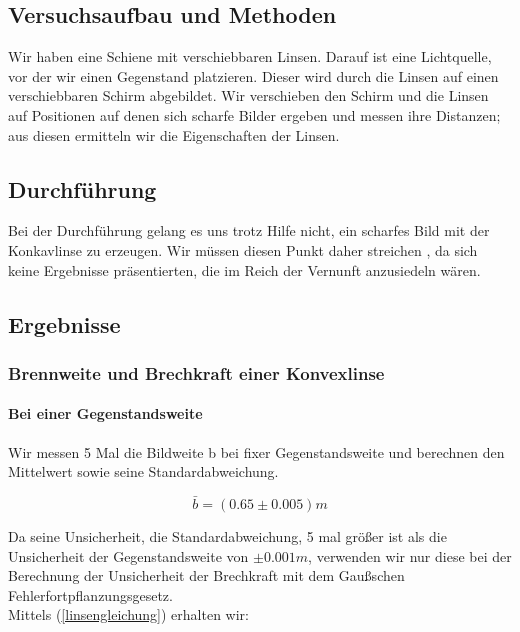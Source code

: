 \documentclass{article}
\begin{document}
\subsection{Versuchsaufbau und Methoden}
Wir haben eine Schiene mit verschiebbaren Linsen. Darauf ist eine Lichtquelle, vor der wir einen Gegenstand platzieren. Dieser wird durch die Linsen auf einen verschiebbaren Schirm abgebildet. Wir verschieben den Schirm und die Linsen auf Positionen auf denen sich scharfe Bilder ergeben und messen ihre Distanzen; aus diesen ermitteln wir die Eigenschaften der Linsen.
\subsection{Durchführung}
Bei der Durchführung gelang es uns trotz Hilfe nicht, ein scharfes Bild mit der Konkavlinse zu erzeugen. Wir müssen diesen Punkt daher streichen	, da sich keine Ergebnisse präsentierten, die im Reich der Vernunft anzusiedeln wären.
\subsection{Ergebnisse}
\subsubsection*{Brennweite und Brechkraft einer Konvexlinse}
\paragraph{Bei einer Gegenstandsweite}

Wir messen 5 Mal die Bildweite b bei fixer Gegenstandsweite und berechnen den Mittelwert sowie seine Standardabweichung.

$$\bar{b}=(0.65 \pm 0.005)m$$

Da seine Unsicherheit, die Standardabweichung, 5 mal größer ist als die Unsicherheit der Gegenstandsweite von $\pm 0.001m$, verwenden wir nur diese bei der Berechnung der Unsicherheit der Brechkraft mit dem Gaußschen Fehlerfortpflanzungsgesetz. \\
Mittels (\ref{linsengleichung}) erhalten wir:\\
\\
\end{document}
